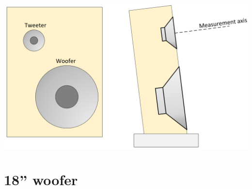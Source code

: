 \documentclass{report}
\begin{document}
\begin{appendices}
\begin{minipage}{0.6\textwidth}
\end{minipage}
\begin{minipage}{0.4\textwidth}
\begin{center}
	\includegraphics[scale=0.2]{Sym/Spkr_BmO}
    \captionsetup{hypcap=false}
    \label{fig:2wayDiagSpkr}
\end{center}
\end{minipage}

%
%


\section{18'' woofer}


\end{appendices}
\end{document}
